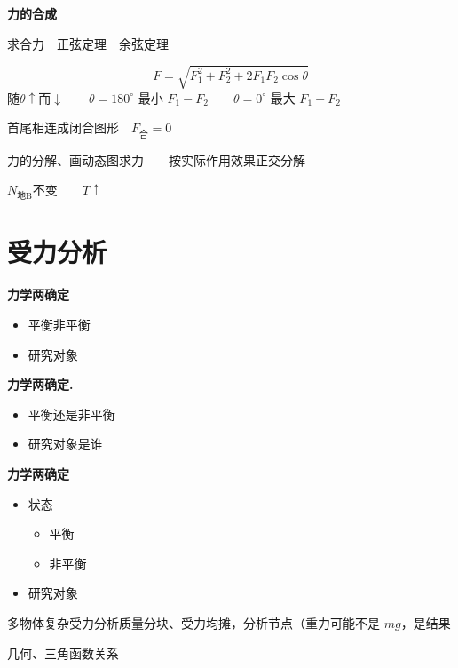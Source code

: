 \textbf{力的合成}

求合力　正弦定理　余弦定理

\[
F=\sqrt{F_1^2+F_2^2+2F_1F_2\cos\theta}
\]
随$\theta\uparrow$而$\downarrow$　　$\theta=180^\circ$ 最小 $F_1-F_2$　　$\theta=0^\circ$ 最大 $F_1+F_2$


首尾相连成闭合图形　$F_{\text{合}}=0$

力的分解、画动态图求力　　按实际作用效果正交分解


$N_{\text{地B}}$不变　　$T\uparrow$


\section{受力分析}
\textbf{力学两确定}
\begin{itemize}
\item 平衡非平衡
\item 研究对象
\end{itemize}

\textbf{力学两确定.}
\begin{itemize}
\item 平衡还是非平衡
\item 研究对象是谁
\end{itemize}

\textbf{力学两确定}
\begin{itemize}
\item 状态
  \begin{itemize}
  \item 平衡
  \item 非平衡
  \end{itemize}
\item 研究对象
\end{itemize}

多物体复杂受力分析\quad 质量分块、受力均摊，分析节点（重力可能不是 $mg$，是结果 %
\par 几何、三角函数关系 %


